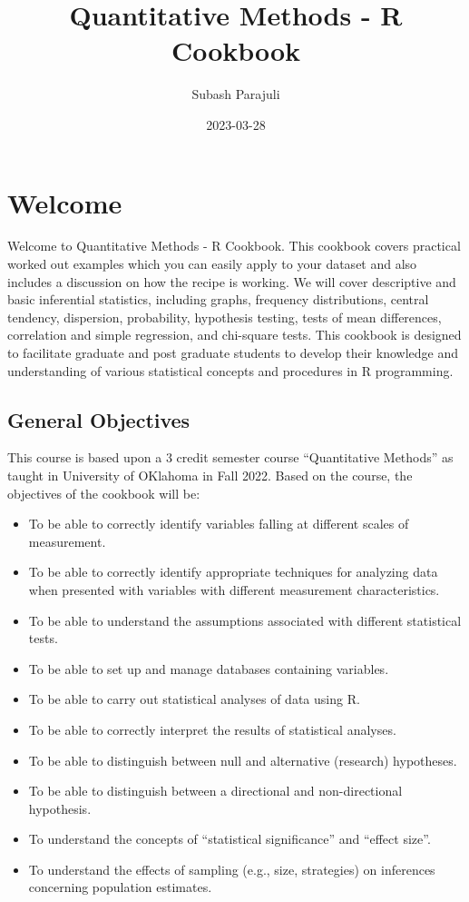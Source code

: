 \documentclass[
]{book}
\title{Quantitative Methods - R Cookbook}
\author{Subash Parajuli}
\date{2023-03-28}
\begin{document}
\maketitle

{
\setcounter{tocdepth}{1}
\tableofcontents
}
\hypertarget{welcome}{%
\chapter*{Welcome}\label{welcome}}

Welcome to Quantitative Methods - R Cookbook. This cookbook covers practical worked out examples which you can easily apply to your dataset and also includes a discussion on how the recipe is working. We will cover descriptive and basic inferential statistics, including graphs, frequency distributions, central tendency, dispersion, probability, hypothesis testing, tests of mean differences, correlation and simple regression, and chi-square tests. This cookbook is designed to facilitate graduate and post graduate students to develop their knowledge and understanding of various statistical concepts and procedures in R programming.

\hypertarget{general-objectives}{%
\section*{General Objectives}\label{general-objectives}}

This course is based upon a 3 credit semester course ``Quantitative Methods'' as taught in University of OKlahoma in Fall 2022. Based on the course, the objectives of the cookbook will be:

\begin{itemize}
\item
  To be able to correctly identify variables falling at different scales of measurement.
\item
  To be able to correctly identify appropriate techniques for analyzing data when presented with variables with different measurement characteristics.
\item
  To be able to understand the assumptions associated with different statistical tests.
\item
  To be able to set up and manage databases containing variables.
\item
  To be able to carry out statistical analyses of data using R.
\item
  To be able to correctly interpret the results of statistical analyses.
\item
  To be able to distinguish between null and alternative (research) hypotheses.
\item
  To be able to distinguish between a directional and non-directional hypothesis.
\item
  To understand the concepts of ``statistical significance'' and ``effect size''.
\item
  To understand the effects of sampling (e.g., size, strategies) on inferences concerning population estimates.
\end{itemize}
\end{document}
